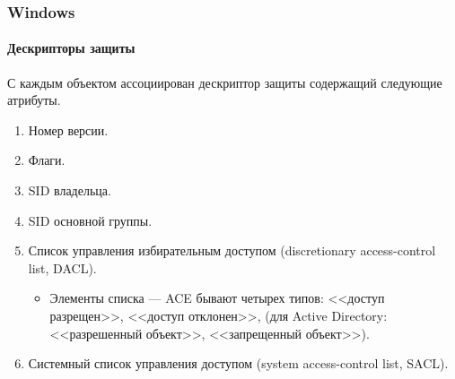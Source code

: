 \begin{frame}
    \frametitle{Windows}
    \framesubtitle{Дескрипторы защиты}
    
    С каждым \alert{объектом} ассоциирован \alert{дескриптор защиты} содержащий следующие атрибуты.
    \begin{enumerate}
        \item Номер версии. 
        \item Флаги.
        \item SID владельца.
        \item SID основной группы. 
        \item Список управления избирательным доступом (discretionary access-control list, \alert{DACL}).
        \begin{itemize}
            \item Элементы списка --- ACE бывают четырех типов: <<доступ разрещен>>, <<доступ отклонен>>, (для Active Directory: <<разрешенный объект>>, <<запрещенный объект>>).
        \end{itemize}
        \item Системный список управления доступом (system access-control list, SACL). 
    \end{enumerate}
\end{frame}


